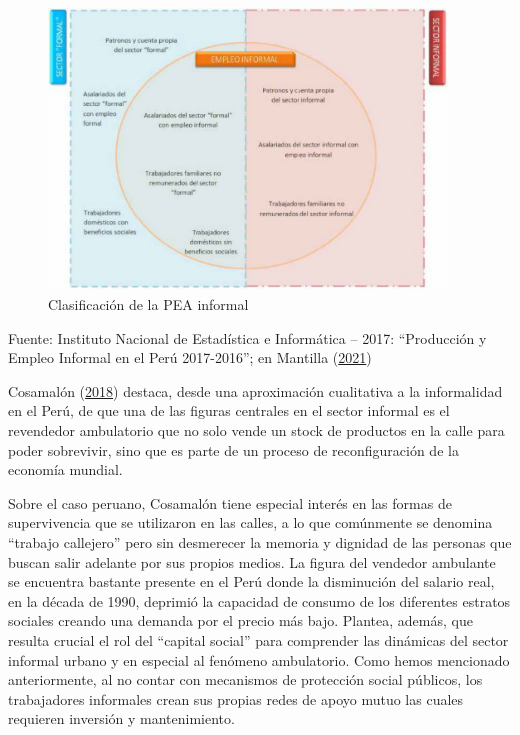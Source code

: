 \documentclass[
  letterpaper,
  12pt,
  oneside,
  spanish,
  doublespacing,
  headsepline,
  parskip]{MastersDoctoralThesis}
\begin{document}
\begin{figure}

\caption{\label{fig-pea}Clasificación de la PEA informal}

{\centering \includegraphics[width=4.16667in,height=\textheight]{Chapters/../Figures/pea_informal1.pdf}

}

\end{figure}

\noindent \small Fuente: Instituto Nacional de Estadística e Informática
-- 2017: ``Producción y Empleo Informal en el Perú 2017-2016''; en
Mantilla (\protect\hyperlink{ref-mantilla2021}{2021}) \normalsize

Cosamalón (\protect\hyperlink{ref-cosamaluxf3n2018}{2018}) destaca,
desde una aproximación cualitativa a la informalidad en el Perú, de que
una de las figuras centrales en el sector informal es el revendedor
ambulatorio que no solo vende un stock de productos en la calle para
poder sobrevivir, sino que es parte de un proceso de reconfiguración de
la economía mundial.

Sobre el caso peruano, Cosamalón tiene especial interés en las formas de
supervivencia que se utilizaron en las calles, a lo que comúnmente se
denomina ``trabajo callejero'' pero sin desmerecer la memoria y dignidad
de las personas que buscan salir adelante por sus propios medios. La
figura del vendedor ambulante se encuentra bastante presente en el Perú
donde la disminución del salario real, en la década de 1990, deprimió la
capacidad de consumo de los diferentes estratos sociales creando una
demanda por el precio más bajo. Plantea, además, que resulta crucial el
rol del ``capital social'' para comprender las dinámicas del sector
informal urbano y en especial al fenómeno ambulatorio. Como hemos
mencionado anteriormente, al no contar con mecanismos de protección
social públicos, los trabajadores informales crean sus propias redes de
apoyo mutuo las cuales requieren inversión y mantenimiento.
\end{document}
